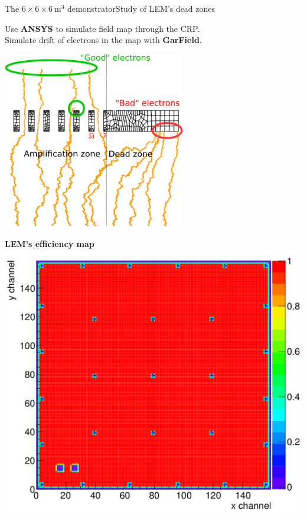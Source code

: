 \documentclass[10pt]{beamer}
\begin{document}
\begin{frame}{The \texorpdfstring{$6 \times 6 \times \SI{6}{\meter\cubed}$}{666} demonstrator}{Study of LEM's dead zones}
\begin{scriptsize}
\begin{minipage}{0.38\textwidth}
    				Use \textbf{ANSYS} to simulate field map through the CRP.\\
    				Simulate drift of electrons in the map with \textbf{GarField}.\\
    		\end{minipage}
    		\begin{minipage}{0.58\textwidth}
    			\centering
    			\includegraphics[width=0.6\textwidth]{figures/666/drift_example.png}\\
    			\vspace{0.5cm} \hspace{0.1cm}
    			\begin{minipage}{0.48\textwidth}
    				\centering
    				\textbf{LEM's efficiency map}\\
    				\includegraphics[width=\textwidth]{figures/666/eff_map.png}

\end{minipage}
\end{minipage}
\end{scriptsize}
\end{frame}
\end{document}
